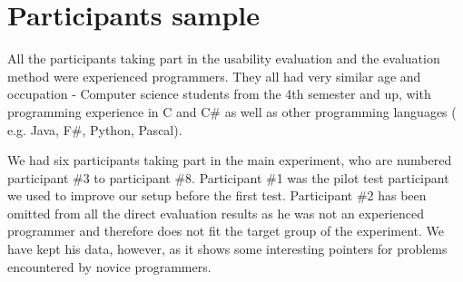 \section{Participants sample}
\label{section:Participant sample}
All the participants taking part in the usability evaluation and the evaluation method were experienced programmers. They all had very similar age and occupation - Computer science students from the 4th semester and up, with programming experience in C and C\# as well as other programming languages ( e.g. Java, F\#, Python, Pascal).

We had six participants taking part in the main experiment, who are numbered participant \#3 to participant \#8.
Participant \#1 was the pilot test participant we used to improve our setup before the first test.
Participant \#2 has been omitted from all the direct evaluation results as he was not an experienced programmer and therefore does not fit the target group of the experiment.
We have kept his data, however, as it shows some interesting pointers for problems encountered by novice programmers.